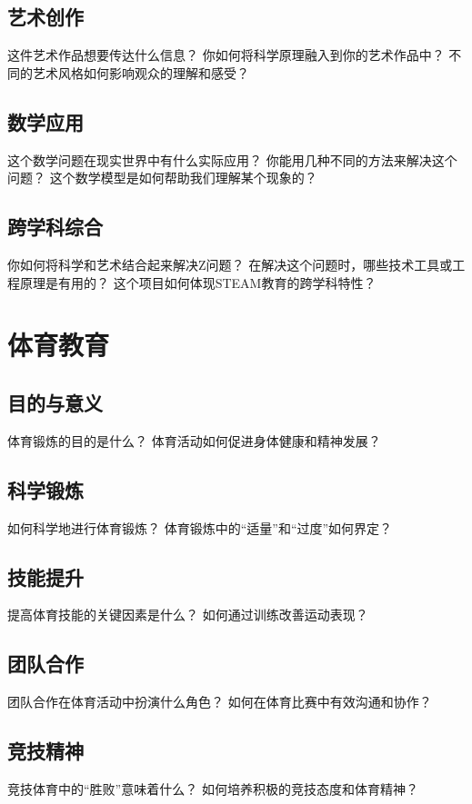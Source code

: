 \documentclass[12pt]{book}
\begin{document}
\subsection{艺术创作}
这件艺术作品想要传达什么信息？
你如何将科学原理融入到你的艺术作品中？
不同的艺术风格如何影响观众的理解和感受？

\subsection{数学应用}
这个数学问题在现实世界中有什么实际应用？
你能用几种不同的方法来解决这个问题？
这个数学模型是如何帮助我们理解某个现象的？

\subsection{跨学科综合}
你如何将科学和艺术结合起来解决Z问题？
在解决这个问题时，哪些技术工具或工程原理是有用的？
这个项目如何体现STEAM教育的跨学科特性？


\section{体育教育}
\subsection{目的与意义}
体育锻炼的目的是什么？
体育活动如何促进身体健康和精神发展？

\subsection{科学锻炼}
如何科学地进行体育锻炼？
体育锻炼中的“适量”和“过度”如何界定？

\subsection{技能提升}
提高体育技能的关键因素是什么？
如何通过训练改善运动表现？

\subsection{团队合作}
团队合作在体育活动中扮演什么角色？
如何在体育比赛中有效沟通和协作？

\subsection{竞技精神}
竞技体育中的“胜败”意味着什么？
如何培养积极的竞技态度和体育精神？
\end{document}
